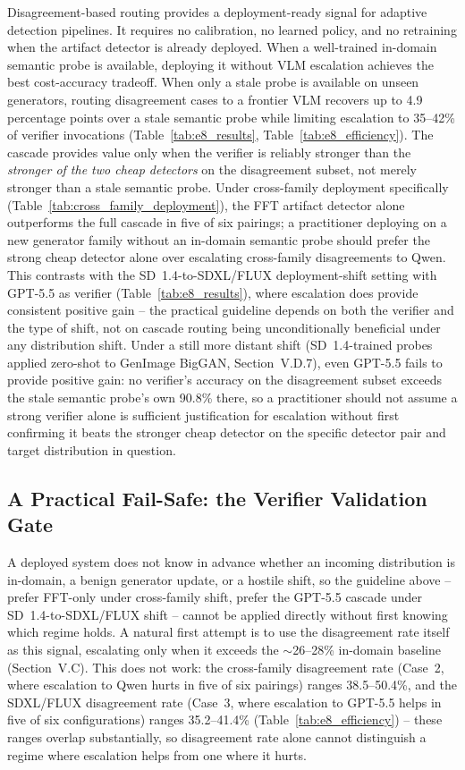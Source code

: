 \documentclass{ieeeaccess}
\begin{document}
Disagreement-based routing provides a deployment-ready signal for adaptive detection
pipelines. It requires no calibration, no learned policy, and no retraining when the
artifact detector is already deployed. When a well-trained in-domain semantic probe
is available, deploying it without VLM escalation achieves the best cost-accuracy
tradeoff. When only a stale probe is available on unseen generators, routing disagreement cases to a frontier VLM recovers up to 4.9 percentage points
over a stale semantic probe while limiting escalation to 35--42\% of verifier
invocations (Table~\ref{tab:e8_results}, Table~\ref{tab:e8_efficiency}).
The cascade provides value only when the verifier is reliably stronger than the
\emph{stronger of the two cheap detectors} on the disagreement subset, not merely
stronger than a stale semantic probe. Under cross-family deployment specifically
(Table~\ref{tab:cross_family_deployment}), the FFT artifact detector alone
outperforms the full cascade in five of six pairings; a practitioner deploying on a
new generator family without an in-domain semantic probe should prefer the strong
cheap detector alone over escalating cross-family disagreements to Qwen. This
contrasts with the SD~1.4-to-SDXL/FLUX deployment-shift setting with GPT-5.5 as
verifier (Table~\ref{tab:e8_results}), where escalation does provide consistent
positive gain -- the practical guideline depends on both the verifier and the type of
shift, not on cascade routing being unconditionally beneficial under any distribution
shift. Under a still more distant shift (SD~1.4-trained probes applied zero-shot to
GenImage BigGAN, Section~V.D.7), even GPT-5.5 fails to provide positive gain: no
verifier's accuracy on the disagreement subset exceeds the stale semantic probe's own
90.8\% there, so a practitioner should not assume a strong verifier alone is sufficient
justification for escalation without first confirming it beats the stronger cheap
detector on the specific detector pair and target distribution in question.

\subsection{A Practical Fail-Safe: the Verifier Validation Gate}
\label{sec:validation_gate}

A deployed system does not know in advance whether an incoming distribution is
in-domain, a benign generator update, or a hostile shift, so the guideline above --
prefer FFT-only under cross-family shift, prefer the GPT-5.5 cascade under SD~1.4-to-SDXL/FLUX
shift -- cannot be applied directly without first knowing which regime holds. A
natural first attempt is to use the disagreement rate itself as this signal, escalating
only when it exceeds the $\sim$26--28\% in-domain baseline (Section~V.C). This does not
work: the cross-family disagreement rate (Case~2, where escalation to Qwen hurts in five
of six pairings) ranges 38.5--50.4\%, and the SDXL/FLUX disagreement rate (Case~3, where
escalation to GPT-5.5 helps in five of six configurations) ranges 35.2--41.4\%
(Table~\ref{tab:e8_efficiency}) -- these ranges overlap substantially, so disagreement
rate alone cannot distinguish a regime where escalation helps from one where it hurts.
\end{document}
